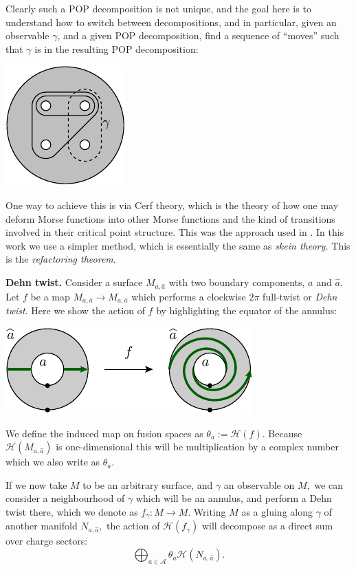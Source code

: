 \documentclass[aps, prl, letterpaper, twocolumn, superscriptaddress, notitlepage, 10pt]{revtex4-1}
\newcommand{\F}{\mathscr{H}} %
\newcommand{\A}{\mathcal{A}}
\newcommand{\subsub}[1]{{\bf #1}}
\begin{document}
Clearly such a POP decomposition is not unique,
and the goal here is to understand how to switch between decompositions,
and in particular, given an observable $\gamma$,
and a given POP decomposition, find a sequence
of ``moves'' such that $\gamma$ is in the resulting POP
decomposition:
\begin{center}
\includegraphics[]{pic-refactor.pdf}
\end{center}

One way to achieve this is via Cerf theory, which is the theory
of how one may deform Morse functions into other Morse functions
and the kind of transitions involved in their critical point structure.
This was the approach used in \cite{Freedman2002simulation}.
In this work we use a simpler method,
which is essentially the same as \emph{skein theory.}
This is the \emph{refactoring theorem}.

\subsub{Dehn twist.}
Consider a surface $M_{a,\widehat{a}}$
with two boundary components, $a$ and $\widehat{a}.$
Let $f$ be a map $M_{a,\widehat{a}}\to M_{a,\widehat{a}}$
which performs a clockwise $2\pi$ full-twist or \emph{Dehn twist}.
Here we show the action of $f$ by highlighting the
equator of the annulus:
\begin{center}
\includegraphics[]{pic-dehn-twist.pdf}
\end{center}
We define the 
induced map on fusion spaces as $\theta_a := \F(f).$
Because $\F(M_{a,\widehat{a}})$ is one-dimensional
this will be multiplication by a complex number which we also
write as $\theta_a.$

If we now take $M$ to be an arbitrary surface, and $\gamma$ an
observable on $M,$ we can consider a neighbourhood of $\gamma$
which will be an annulus, and perform a Dehn twist there,
which we denote as $f_\gamma : M\to M.$
Writing $M$ as a gluing along $\gamma$ of another
manifold $N_{a,\widehat{a}},$
the action of $\F(f_\gamma)$ will decompose as a direct sum over charge 
sectors:
$$
\bigoplus_{a\in\A} \theta_a \F(N_{a,\widehat{a}}).
$$
\end{document}
